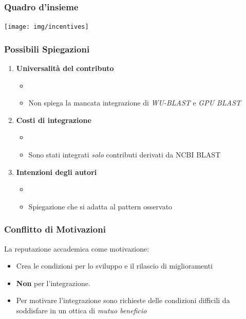 \begin{frame}\frametitle{Quadro d'insieme}

\begin{center}
    \texttt{[image: img/incentives]}
\end{center}

\end{frame}

\begin{frame}\frametitle{Possibili Spiegazioni}

\Large

\begin{enumerate}[<+->]
\def\labelenumi{\arabic{enumi}.}
\itemsep1pt\parskip0pt
\item
  \textbf{Universalità del contributo}

  \begin{itemize}[<+->]
  \itemsep1pt\parskip0pt
  \item
  \item
    Non spiega la mancata integrazione di \emph{WU-BLAST} e \emph{GPU
    BLAST}
  \end{itemize}
\item
  \textbf{Costi di integrazione}

  \begin{itemize}[<+->]
  \itemsep1pt\parskip0pt
  \item
  \item
    Sono stati integrati \emph{solo} contributi derivati da NCBI BLAST
  \end{itemize}
\item
  \textbf{Intenzioni degli autori}

  \begin{itemize}[<+->]
  \itemsep1pt\parskip0pt
  \item
  \item
    Spiegazione che si adatta al pattern osservato
  \end{itemize}
\end{enumerate}

\end{frame}

\begin{frame}\frametitle{Conflitto di Motivazioni}

\Large{La reputazione accademica come \alert{motivazione}:}

\begin{itemize}[<+->]
\itemsep1pt\parskip0pt
\item
  Crea le condizioni per lo sviluppo e il rilascio di miglioramenti
\item
  \textbf{Non} per l'integrazione.
\item
  Per motivare l'integrazione sono richieste delle condizioni
  \alert{difficili} da soddisfare in un ottica di
  \alert{\em{mutuo beneficio}}
\end{itemize}

\end{frame}

